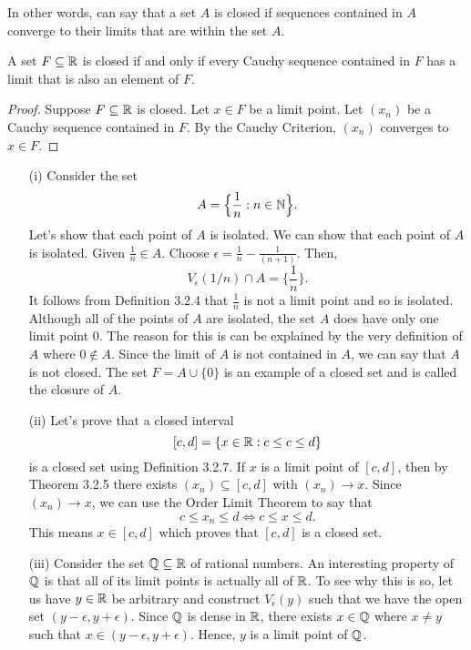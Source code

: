 In other words, can say that a set \( A  \) is closed if sequences contained in \(  A  \) converge to their limits that are within the set \( A  \). 

\begin{theorem}{}{}
A set \( F \subseteq \mathbb{R} \) is closed if and only if every Cauchy sequence contained in \( F \) has a limit that is also an element of \( F \). 
\end{theorem}

\begin{proof}
    Suppose \( F \subseteq \mathbb{R}  \) is closed. Let \( x \in F \) be a limit point. Let \( (x_n) \) be a Cauchy sequence contained in \( F  \). By the Cauchy Criterion, \( (x_n) \) converges to \( x \in F  \). 
\end{proof}
\begin{example}{}{}
\begin{enumerate}
    \item[(i)] Consider the set 
        \[ A = \Big\{ \frac{ 1 }{ n }  : n \in \mathbb{N} \Big\}.   \]
        Let's show that each point of \( A  \) is isolated. We can show that each point of \( A  \) is isolated. Given \( \frac{ 1 }{ n }  \in A \). Choose \( \epsilon = \frac{ 1 }{ n }  - \frac{ 1 }{ (n+1) }. \) Then, 
        \[ V_{\epsilon } (1/n) \cap A = \Big\{ \frac{ 1 }{ n } \Big\}. \]
        It follows from Definition 3.2.4 that \( \frac{ 1 }{ n }  \) is not a limit point and so is isolated. Although all of the points of \( A  \) are isolated, the set \( A  \) does have only one limit point 0. The reason for this is can be explained by the very definition of \( A  \) where \( 0 \notin A  \). Since the limit of \( A \) is not contained in \( A \), we can say that \( A  \) is not closed. The set \( F = A \cup \{ 0 \}  \) is an example of a closed set and is called the closure of \( A \).   
    \item[(ii)] Let's prove that a closed interval 
        \[ [c,d] = \{ x \in \mathbb{R} : c \leq c \leq d \}  \]
        is a closed set using Definition 3.2.7. If \( x \) is a limit point of \( [c,d] \), then by Theorem 3.2.5 there exists \( (x_n) \subseteq [c,d] \) with \( (x_n) \to x  \). Since \( (x_n) \to x  \), we can use the Order Limit Theorem to say that 
        \[ c \leq x_n \leq d \iff c \leq x \leq d. \]
        This means \( x \in [c,d] \) which proves that \( [c,d] \) is a closed set. 
    \item[(iii)] Consider the set \( \mathbb{Q} \subseteq \mathbb{R}  \) of rational numbers. An interesting property of \( \mathbb{Q} \) is that all of its limit points is actually all of \( \mathbb{R}  \). To see why this is so, let us have \( y \in \mathbb{R}  \) be arbitrary and construct \( V_{\epsilon }(y) \) such that we have the open set \( (y- \epsilon , y + \epsilon ) \). Since \( \mathbb{Q}  \) is dense in \( \mathbb{R} \), there exists \( x \in \mathbb{Q} \) where \( x \neq y \) such that \(x \in (y-\epsilon , y+\epsilon ) \). Hence, \( y  \) is a limit point of \( \mathbb{Q} \).  
\end{enumerate}
\end{example}

